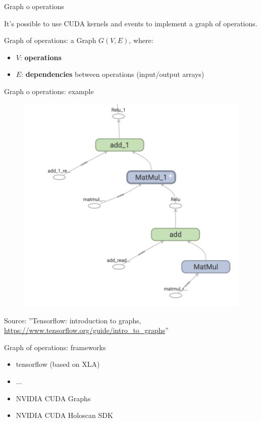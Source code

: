 \documentclass[xcolor=table]{beamer}
\begin{document}
\begin{frame}{Graph o operations}

  It's possible to use CUDA kernels and events to implement a graph of operations.

  Graph of operations: a Graph $G(V, E)$, where:
  \begin{itemize}
    \item $V$: \textbf{operations}
    \item $E$: \textbf{dependencies} between operations (input/output arrays)
  \end{itemize}

\end{frame}

\begin{frame}{Graph o operations: example}

  \begin{figure}
    \includegraphics[scale=0.2]{imgs/tf_graph.png}
  \end{figure}
  \footnotesize Source: ''Tensorflow: introduction to graphs, \url{https://www.tensorflow.org/guide/intro_to_graphs}''
\end{frame}


\begin{frame}{Graph of operations: frameworks}

  \begin{itemize}
  \item tensorflow (based on XLA)
  \item ...
  \item NVIDIA CUDA Graphs
  \item NVIDIA CUDA Holoscan SDK
  \end{itemize}

\end{frame}
\end{document}
